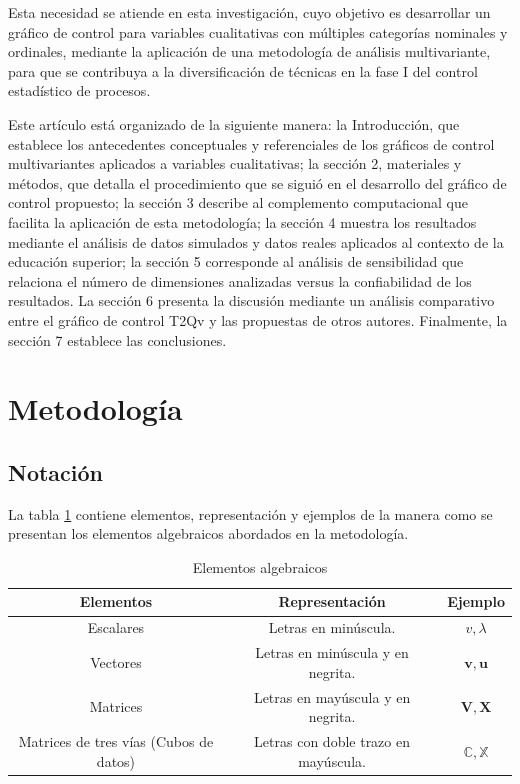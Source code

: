 \documentclass[mathematics,article,submit,moreauthors,pdftex]{mdpi}
\begin{document}
Esta necesidad se atiende en esta investigación, cuyo objetivo es
desarrollar un gráfico de control para variables cualitativas con
múltiples categorías nominales y ordinales, mediante la aplicación de
una metodología de análisis multivariante, para que se contribuya a la
diversificación de técnicas en la fase I del control estadístico de
procesos.

Este artículo está organizado de la siguiente manera: la Introducción,
que establece los antecedentes conceptuales y referenciales de los
gráficos de control multivariantes aplicados a variables cualitativas;
la sección 2, materiales y métodos, que detalla el procedimiento que se
siguió en el desarrollo del gráfico de control propuesto; la sección 3
describe al complemento computacional que facilita la aplicación de esta
metodología; la sección 4 muestra los resultados mediante el análisis de
datos simulados y datos reales aplicados al contexto de la educación
superior; la sección 5 corresponde al análisis de sensibilidad que
relaciona el número de dimensiones analizadas versus la confiabilidad de
los resultados. La sección 6 presenta la discusión mediante un análisis
comparativo entre el gráfico de control T2Qv y las propuestas de otros
autores. Finalmente, la sección 7 establece las conclusiones.

\hypertarget{metodologuxeda}{%
\section{Metodología}\label{metodologuxeda}}

\hypertarget{notaciuxf3n}{%
\subsection{Notación}\label{notaciuxf3n}}

La tabla \ref{tab:notacion} contiene elementos, representación y
ejemplos de la manera como se presentan los elementos algebraicos
abordados en la metodología.

\begin{table}[!ht]
\begin{center}
 \begin{tabular}{||c ||c |c ||} 
 \hline
 Elementos & Representación & Ejemplo \\
 \hline\hline
 Escalares & Letras en minúscula. & $v,\lambda$\\
\hline
Vectores & Letras en minúscula y en negrita. & $\mathbf{v},\mathbf{u}$\\
\hline
Matrices & Letras en mayúscula y en negrita. & $\mathbf{V},\mathbf{X}$\\
\hline
Matrices de tres vías (Cubos de datos) & Letras con doble trazo en mayúscula. & $\mathbb{C},\mathbb{X}$\\
\hline
\end{tabular}\caption{Elementos algebraicos}
\label{tab:notacion}
\end{center}
\end{table}
\end{document}
